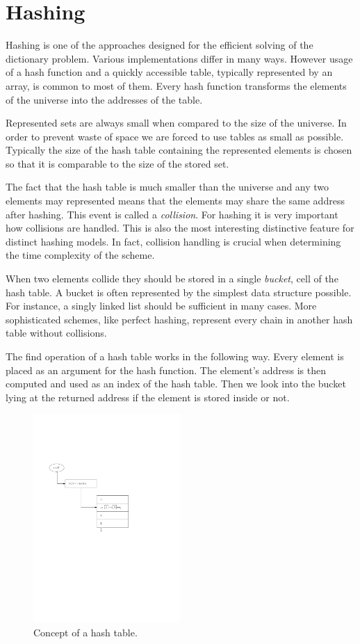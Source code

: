 \chapter{Hashing}
\label{chapter-hashing}
Hashing is one of the approaches designed for the efficient solving of the dictionary problem. Various implementations differ in many ways. However usage of a hash function and a quickly accessible table, typically represented by an array, is common to most of them. Every hash function transforms the elements of the universe into the addresses of the table.

Represented sets are always small when compared to the size of the universe. In order to prevent waste of space we are forced to use tables as small as possible. Typically the size of the hash table containing the represented elements is chosen so that it is comparable to the size of the stored set. 

The fact that the hash table is much smaller than the universe and any two elements may represented means that the elements may share the same address after hashing. This event is called a \emph{collision}. For hashing it is very important how collisions are handled. This is also the most interesting distinctive feature for distinct hashing models. In fact, collision handling is crucial when determining the time complexity of the scheme.

When two elements collide they should be stored in a single \emph{bucket}, cell of the hash table. A bucket is often represented by the simplest data structure possible. For instance, a singly linked list should be sufficient in many cases. More sophisticated schemes, like perfect hashing, represent every chain in another hash table without collisions.

The find operation of a hash table works in the following way. Every element is placed as an argument for the hash function. The element's address is then computed and used as an index of the hash table. Then we look into the bucket lying at the returned address if the element is stored inside or not.

\begin{figure}
  \centering
    \includegraphics[width=0.5\textwidth]{images/hash_table}
  \caption{Concept of a hash table.}
\end{figure}


